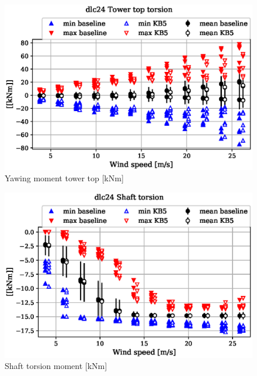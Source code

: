 \begin{figure}[!ht]
\begin{center}
	\includegraphics[width=.85\linewidth]{figures/baseline-vs-KB6/dlc24/tower-tower-node-004-momentvec-z_AA0007_AA0003.eps}
\end{center}
\caption{Yawing moment tower top [kNm]}
\label{fig:baseline-vs-KB6:dlc24:tower-top-yaw}
\end{figure}

\begin{figure}[!ht]
\begin{center}
	\includegraphics[width=.85\linewidth]{figures/baseline-vs-KB6/dlc24/shaft-shaft-node-001-momentvec-z_AA0007_AA0003.eps}
\end{center}
\caption{Shaft torsion moment [kNm]}
\label{fig:baseline-vs-KB6:dlc24:shaft-torsion}
\end{figure}

